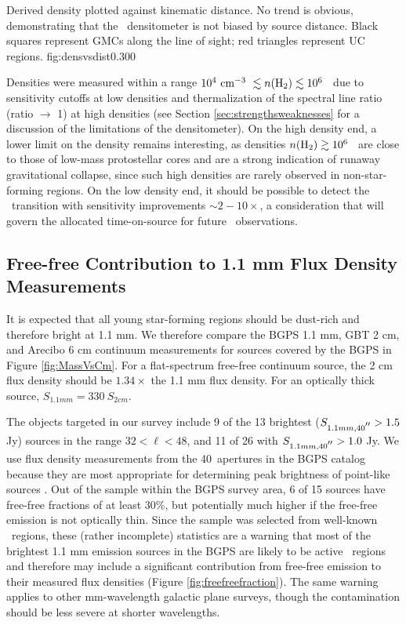 {Derived density plotted against kinematic distance.  No trend is obvious, demonstrating
that the \formaldehyde\ densitometer is not biased by source distance.
Black squares represent GMCs along the line of sight; red triangles represent
UC regions.}
{fig:densvsdist}{0.30}{0}

Densities were measured within a range $10^4\ \textrm{cm}^{-3}\ \lesssim n(\textrm{H}_{2})
\lesssim10^6$ \percc\ due to sensitivity cutoffs at low densities and
thermalization of the spectral line ratio (ratio $\rightarrow$ 1) at high densities (see 
Section \ref{sec:strengthsweaknesses} for a discussion of the limitations of the
densitometer).  On the high density end, a lower limit on the density remains
interesting, as densities $n(\textrm{H}_{2})\gtrsim10^6$ \percc\ are close to those of low-mass
protostellar cores and are a strong indication of runaway gravitational
collapse, since such high densities are rarely observed in non-star-forming
regions.  On the low density end, it should be possible to detect the \twotwo\
transition with sensitivity improvements $\sim2-10\times$, a consideration that
will govern the allocated time-on-source for future \twotwo\ observations.

\subsection{Free-free Contribution to 1.1 mm Flux Density Measurements}
It is expected that all young star-forming regions should be dust-rich and
therefore bright at 1.1 mm.  We therefore compare the BGPS 1.1 mm, GBT 2 cm,
and Arecibo 6 cm continuum measurements for sources covered by the BGPS in
Figure \ref{fig:MassVsCm}.  For a flat-spectrum \citep[$\alpha \approx -0.1$,
$\tau_{ff}<<1$;][]{rohlfs} free-free continuum source, the 2 cm flux density
should be $1.34\times$ the 1.1 mm flux density.  For an optically thick source,
$S_{1.1 mm} = 330~S_{2 cm}$.

The objects targeted in our survey include 9 of the 13 brightest ($S_{1.1 mm,40\mbox{$^{\prime\prime}$}}>1.5$
Jy) sources in the range $32<\ell<48$, and 11 of 26 with $S_{1.1mm,
40\mbox{$^{\prime\prime}$}}>1.0$ Jy. We use flux density measurements from the 40\arcsec\ apertures in the BGPS catalog
because they are most appropriate for determining peak brightness of point-like
sources \citep{Rosolowsky2010}.  Out of the sample within the BGPS survey area,
6 of 15 sources have free-free fractions of at least 30\%, but potentially much higher if 
the free-free emission is not optically thin.  Since the sample was selected from
well-known \uchii\ regions, these (rather incomplete) statistics are a warning
that most of the brightest 1.1 mm emission sources in the BGPS are likely to be
active \uchii\ regions and therefore may include a significant contribution
from free-free emission to their measured flux densities (Figure
\ref{fig:freefreefraction}).  The same warning applies to other mm-wavelength galactic
plane surveys, though the contamination should be less severe at shorter wavelengths.

